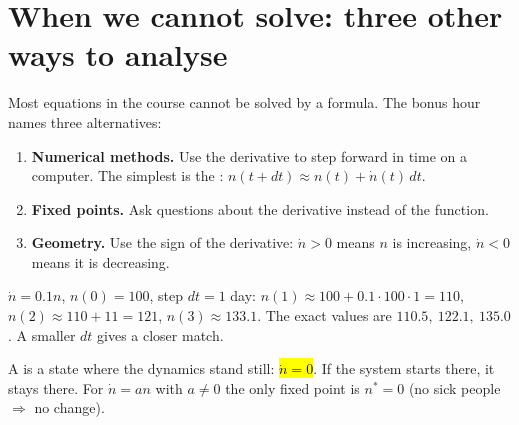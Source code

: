 \section{When we cannot solve: three other ways to analyse}

Most equations in the course cannot be solved by a formula. The bonus hour names three alternatives:

\begin{enumerate}
  \item \textbf{Numerical methods.} Use the derivative to step forward in time on a computer. The simplest is the
         : $n(t+dt) \approx n(t) + \dot n(t)\,dt$.
  \item \textbf{Fixed points.} Ask questions about the derivative instead of the function.
  \item \textbf{Geometry.} Use the sign of the derivative: $\dot n>0$ means $n$ is increasing, $\dot n<0$ means it is decreasing.
\end{enumerate}

\begin{example}
$\dot n = 0.1n$, $n(0)=100$, step $dt=1$ day:
$n(1)\approx 100+0.1\cdot100\cdot1 = 110$, $n(2)\approx 110+11 = 121$, $n(3)\approx 133.1$.
The exact values are $110.5,\ 122.1,\ 135.0$. A smaller $dt$ gives a closer match.
\end{example}

\begin{defn}
A  is a state where the dynamics stand still: \hl{$\dot n = 0$}. If the system starts there, it stays there.
For $\dot n = an$ with $a\neq 0$ the only fixed point is $n^*=0$ (no sick people $\Rightarrow$ no change).
\end{defn}

\begin{center}
\end{center}


